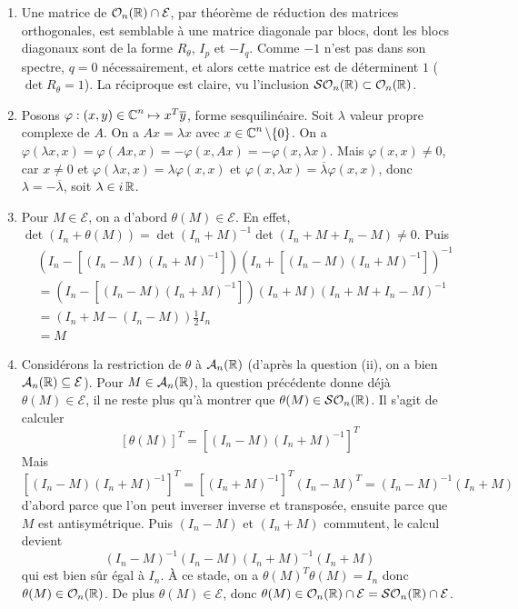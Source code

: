 \begin{solution}
	\begin{enumerate}
		\item Une matrice de $\mathcal O_n(\operatorname{\mathbb R})\cap \mathcal E$, par théorème de réduction des matrices orthogonales,
		est semblable à une matrice diagonale par blocs, dont les blocs diagonaux sont de la forme $R_\theta$, $I_p$ et $-I_q$.
		Comme $-1$ n'est pas dans son spectre, $q=0$ nécessairement, et alors cette matrice est de déterminent $1$ ($\det R_\theta = 1$).
		La réciproque est claire, vu l'inclusion $\mathcal{SO}_n(\operatorname{\mathbb R})\subset \mathcal{O}_n(\operatorname{\mathbb R})$.

		\item Posons $\varphi:(x,y)\in\operatorname{\mathbb C}^n\mapsto x^T\overline y$, forme sesquilinéaire. 
		Soit $\lambda$ valeur propre complexe de $A$. 
		On a $Ax=\lambda x$ avec $x\in \operatorname{\mathbb C}^n\backslash\lbrace 0\rbrace$. 
		On a $\varphi(\lambda x,x)=\varphi(Ax,x)=-\varphi(x,Ax)=-\varphi(x,\lambda x)$.
		Mais $\varphi(x,x)\neq 0$, car $x\neq 0$ et $\varphi(\lambda x,x)=\lambda\varphi(x,x)$ et $\varphi(x,\lambda x)=\overline\lambda\varphi(x,x)$,
		donc $\lambda=-\overline\lambda$, soit $\lambda\in i\operatorname{\mathbb R}$.

		\item Pour $M\in\mathcal E$, on a d'abord $\theta(M)\in\mathcal E$. 
		En effet, $\det(I_n+\theta(M))=\det(I_n+M)^{-1}\det(I_n+M+I_n-M)\neq 0$.
		Puis
		\begin{align*}
			&	(I_n-[(I_n-M)(I_n+M)^{-1}])(I_n+[(I_n-M)(I_n+M)^{-1}])^{-1}\\
			& = (I_n-[(I_n-M)(I_n+M)^{-1}])(I_n+M)(I_n+M+I_n-M)^{-1}\\
			& = (I_n+M-(I_n-M))\frac12 I_n\\
			& = M
		\end{align*}

		\item Considérons la restriction de $\theta$ à $\mathcal A_n(\operatorname{\mathbb R})$ (d'après la question (ii), on a bien $\mathcal A_n(\operatorname{\mathbb R})\subseteq \mathcal E$). Pour $M\in\mathcal A_n(\operatorname{\mathbb R})$, la question précédente donne déjà $\theta(M)\in \mathcal E$, il ne reste plus qu'à montrer que $\theta(M)\in\mathcal{SO}_n(\operatorname{\mathbb R})$. Il s'agit de calculer 
		\[[\theta(M)]^T = [(I_n-M)(I_n+M)^{-1}]^T\]
		Mais $[(I_n-M)(I_n+M)^{-1}]^T=[(I_n+M)^{-1}]^T(I_n-M)^T=(I_n-M)^{-1}(I_n+M)$
		d'abord parce que l'on peut inverser inverse et transposée, ensuite parce que $M$ est antisymétrique. Puis $(I_n-M)$ et $(I_n+M)$ commutent, le calcul devient 
		\[(I_n-M)^{-1}(I_n-M)(I_n+M)^{-1}(I_n+M)\]
		qui est bien sûr égal à $I_n$. 
		À ce stade, on a $\theta(M)^T \theta(M) = I_n$ donc $\theta(M)\in\mathcal O_n(\operatorname{\mathbb R})$. De plus $\theta(M)\in\mathcal E$, donc $\theta(M)\in\mathcal O_n(\operatorname{\mathbb R})\cap\mathcal E=\mathcal{SO}_n(\operatorname{\mathbb R})\cap\mathcal E$.


\end{enumerate}
\end{solution}
